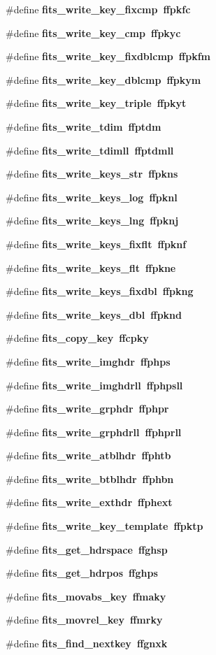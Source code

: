\begin{CompactItemize}
\#define \bf{fits\_\-write\_\-key\_\-fixcmp}~ffpkfc
\item 
\#define \bf{fits\_\-write\_\-key\_\-cmp}~ffpkyc
\item 
\#define \bf{fits\_\-write\_\-key\_\-fixdblcmp}~ffpkfm
\item 
\#define \bf{fits\_\-write\_\-key\_\-dblcmp}~ffpkym
\item 
\#define \bf{fits\_\-write\_\-key\_\-triple}~ffpkyt
\item 
\#define \bf{fits\_\-write\_\-tdim}~ffptdm
\item 
\#define \bf{fits\_\-write\_\-tdimll}~ffptdmll
\item 
\#define \bf{fits\_\-write\_\-keys\_\-str}~ffpkns
\item 
\#define \bf{fits\_\-write\_\-keys\_\-log}~ffpknl
\item 
\#define \bf{fits\_\-write\_\-keys\_\-lng}~ffpknj
\item 
\#define \bf{fits\_\-write\_\-keys\_\-fixflt}~ffpknf
\item 
\#define \bf{fits\_\-write\_\-keys\_\-flt}~ffpkne
\item 
\#define \bf{fits\_\-write\_\-keys\_\-fixdbl}~ffpkng
\item 
\#define \bf{fits\_\-write\_\-keys\_\-dbl}~ffpknd
\item 
\#define \bf{fits\_\-copy\_\-key}~ffcpky
\item 
\#define \bf{fits\_\-write\_\-imghdr}~ffphps
\item 
\#define \bf{fits\_\-write\_\-imghdrll}~ffphpsll
\item 
\#define \bf{fits\_\-write\_\-grphdr}~ffphpr
\item 
\#define \bf{fits\_\-write\_\-grphdrll}~ffphprll
\item 
\#define \bf{fits\_\-write\_\-atblhdr}~ffphtb
\item 
\#define \bf{fits\_\-write\_\-btblhdr}~ffphbn
\item 
\#define \bf{fits\_\-write\_\-exthdr}~ffphext
\item 
\#define \bf{fits\_\-write\_\-key\_\-template}~ffpktp
\item 
\#define \bf{fits\_\-get\_\-hdrspace}~ffghsp
\item 
\#define \bf{fits\_\-get\_\-hdrpos}~ffghps
\item 
\#define \bf{fits\_\-movabs\_\-key}~ffmaky
\item 
\#define \bf{fits\_\-movrel\_\-key}~ffmrky
\item 
\#define \bf{fits\_\-find\_\-nextkey}~ffgnxk

\end{CompactItemize}
